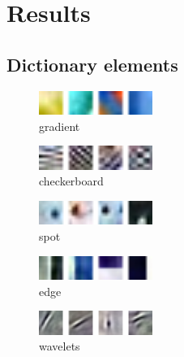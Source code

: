 \chapter{Results}


\section{Dictionary elements}

\begin{figure}
\centering
\includegraphics[width = 0.33\textwidth]{images/gradient.png} 
\caption{gradient}
\label{fig:gradient}
\end{figure}

\begin{figure}
\centering
\includegraphics[width = 0.33\textwidth]{images/checkerboard.png}
\caption{checkerboard}
\label{fig:checkerboard}
\end{figure}


\begin{figure}
\centering
\includegraphics[width = 0.33\textwidth]{images/spot.png} 
\caption{spot}
\label{fig:spot}
\end{figure}


\begin{figure}
\centering
\includegraphics[width = 0.33\textwidth]{images/edges.png}
\caption{edge}
\label{fig:edge}
\end{figure}

\begin{figure}
\centering
\includegraphics[width = 0.33\textwidth]{images/wavelet.png}
\caption{wavelets}
\label{fig:wavelets}
\end{figure}


